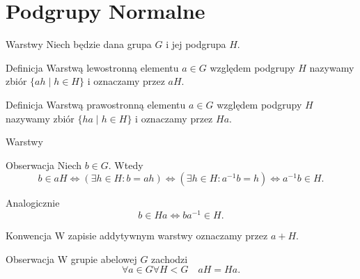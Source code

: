 \documentclass{beamer}
\begin{document}
\section{Podgrupy Normalne}

\begin{frame}{Warstwy}
    Niech będzie dana grupa $G$ i jej podgrupa $H$.
    \begin{block}{Definicja}
        \alert{Warstwą lewostronną} elementu $a \in G$ względem podgrupy $H$
        nazywamy zbiór $\{a h \mid h \in H\}$ i oznaczamy przez $aH$.
    \end{block}    
    \begin{block}{Definicja}
        \alert{Warstwą prawostronną} elementu $a \in G$ względem podgrupy $H$
        nazywamy zbiór $\{h  a \mid h \in H\}$ i oznaczamy przez $Ha$.
    \end{block}
\end{frame}

\begin{frame}{Warstwy}
    \begin{alertblock}{Obserwacja}
        Niech $b \in G$. Wtedy
        $$b \in aH\Leftrightarrow ( \exists h \in H : b=ah) \Leftrightarrow (\exists h \in H : a^{-1}b = h) \Leftrightarrow a^{-1}b \in H.$$

        Analogicznie
        $$b \in Ha \Leftrightarrow ba^{-1} \in H.$$
    \end{alertblock}
    \pause 
    \begin{alertblock}{Konwencja}
        W zapisie addytywnym warstwy oznaczamy przez $a + H$.
    \end{alertblock}

    \begin{alertblock}{Obserwacja}
        W grupie abelowej $G$ zachodzi 
        $$ \forall a \in G \forall H < G \quad aH = Ha.$$
    \end{alertblock}
\end{frame}
\end{document}
